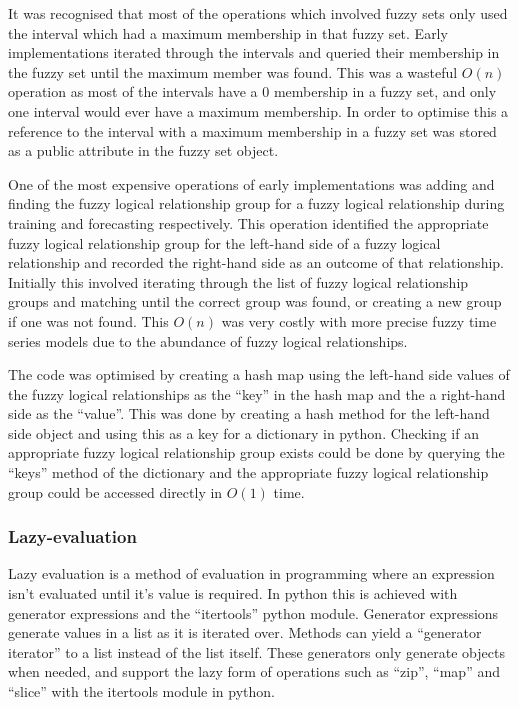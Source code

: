 \documentclass[12pt, oneside, a4paper]{article}
\theoremstyle{definition}
\begin{document}
It was recognised that most of the operations which involved fuzzy sets only used the interval which had a maximum membership in that fuzzy set. Early implementations iterated through the intervals and queried their membership in the fuzzy set until the maximum member was found. This was a wasteful $O(n)$ operation as most of the intervals have a $0$ membership in a fuzzy set, and only one interval would ever have a maximum membership. In order to optimise this a reference to the interval with a maximum membership in a fuzzy set was stored as a public attribute in the fuzzy set object.

One of the most expensive operations of early implementations was adding and finding the fuzzy logical relationship group for a fuzzy logical relationship during training and forecasting respectively. This operation identified the appropriate fuzzy logical relationship group for the left-hand side of a fuzzy logical relationship and recorded the right-hand side as an outcome of that relationship. Initially this involved iterating through the list of fuzzy logical relationship groups and matching until the correct group was found, or creating a new group if one was not found. This $O(n)$ was very costly with more precise fuzzy time series models due to the abundance of fuzzy logical relationships. 

The code was optimised by creating a hash map using the left-hand side values of the fuzzy logical relationships as the ``key'' in the hash map and the a right-hand side as the ``value''. This was done by creating a hash method for the left-hand side object and using this as a key for a dictionary in python. Checking if an appropriate fuzzy logical relationship group exists could be done by querying the ``keys'' method of the dictionary and the appropriate fuzzy logical relationship group could be accessed directly in $O(1)$ time.

\subsubsection{Lazy-evaluation}

Lazy evaluation is a method of evaluation in programming where an expression isn't evaluated until it's value is required. In python this is achieved with generator expressions and the ``itertools'' python module. Generator expressions generate values in a list as it is iterated over. Methods can yield a ``generator iterator'' to a list instead of the list itself. These generators only generate objects when needed, and support the lazy form of operations such as ``zip'', ``map'' and ``slice'' with the itertools module in python.
\end{document}
